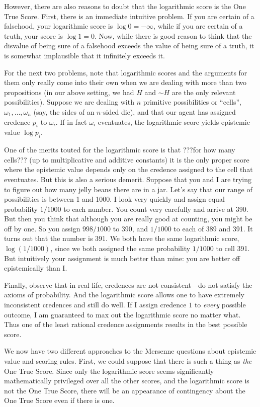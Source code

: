 However, there are also reasons to doubt that the logarithmic score is the One True Score. 
First, there is an immediate intuitive problem. If you are certain of a falsehood, your logarithmic score is $\log 0 = -\infty$, while
if you are certain of a truth, your score is $\log 1 = 0$. Now, while there is good reason to think that the disvalue of being
sure of a falsehood exceeds the value of being sure of a truth, it is somewhat implausible that it infinitely exceeds it. 

For the next two problems, note that logarithmic scores and the arguments for them only really come into their own when we are 
dealing with more than two propositions (in our above setting, we had $H$ and $\sim H$ are the only relevant possibilities). Suppose 
we are dealing with $n$ primitive possibilities or ``cells'', $\omega_1,\dots,\omega_n$ (say, the sides of an $n$-sided die), and that our agent 
has assigned credence $p_i$ to $\omega_i$. If in fact $\omega_i$ eventuates, the logarithmic score yields epistemic value 
$\log p_i$. 

One of the merits touted for the logarithmic score is that ???for how many cells??? (up to multiplicative and additive constants) it is 
the only proper score where the epistemic value depends only on the credence assigned to the cell that eventuates.  But this is also
a serious demerit. Suppose that you and I are trying to figure out how many jelly beans there are in a jar. Let's say that our range of
possibilities is between 1 and 1000. I look very quickly and assign equal probability $1/1000$ to each number. You count very carefully
and arrive at 390. But then you think that although you are really good at counting, you might be off by one. So you assign $998/1000$
to 390, and $1/1000$ to each of 389 and 391. It turns out that the number is 391. We both have the same logarithmic score, $\log (1/1000)$,
since we both assigned the same probability $1/1000$ to cell 391. But intuitively your assignment is much better than mine: you are better
off epistemically than I.

Finally, observe that in real life, credences are not consistent---do not satisfy the axioms of probability. And the logarithmic score
allows one to have extremely inconsistent credences and still do well. If I assign credence $1$ to \textit{every} possible outcome, I am
guaranteed to max out the logarithmic score no matter what. Thus one of the least rational credence assignments results in the best
possible score.

We now have two different approaches to the Mersenne questions about epistemic value and scoring rules. First, we could suppose that there
is such a thing as \textit{the} One True Score. Since only the logarithmic score seems significantly mathematically privileged over all
the other scores, and the logarithmic score is not the One True Score, there will be an appearance of contingency about the
One True Score even if there is one.

